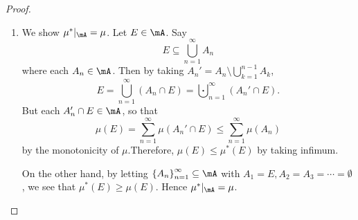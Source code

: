 \documentclass[pmath451]{subfiles}
\begin{document}
    \begin{proof}
        \begin{enumerate}
            \item We show $\mu^{*}|_{\mA} = \mu$. Let $E\in\mA$. Say
                \begin{equation*}
                    E \subseteq \bigcup^{\infty}_{n=1}A_n
                \end{equation*}
                where each $A_n\in\mA$. Then by taking $A_n' = A_n\setminus\bigcup^{n-1}_{k=1}A_k$,
                \begin{equation*}
                    E = \bigcup^{\infty}_{n=1} \left( A_n\cap E \right) = \bigcupdot^{\infty}_{n=1} \left( A_n'\cap E \right).
                \end{equation*}
                But each $A_n'\cap E\in\mA$, so that
                \begin{equation*}
                    \mu\left( E \right) = \sum^{\infty}_{n=1} \mu\left( A_n'\cap E \right) \leq \sum^{\infty}_{n=1} \mu\left( A_n \right)
                \end{equation*}
                by the monotonicity of $\mu$.\footnotemark[1] Therefore, $\mu\left( E \right)\leq \mu^{*}\left( E \right)$ by taking infimum.

                On the other hand, by letting $\left\lbrace A_n \right\rbrace^{\infty}_{n=1}\subseteq\mA$ with $A_1 = E, A_2=A_3=\cdots=\emptyset$, we see that $\mu^{*}\left( E \right)\geq \mu\left( E \right)$. Hence $\mu^{*}|_{\mA}=\mu$.


\end{enumerate}
\end{proof}
\end{document}
